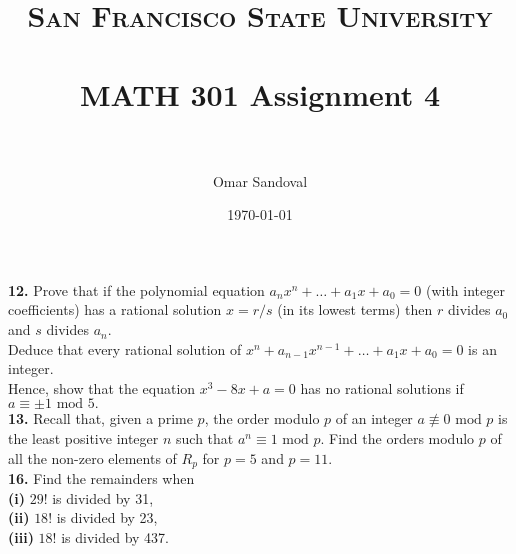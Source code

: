 \documentclass[paper=letter, fontsize=11pt]{scrartcl} %
\title{	
\normalfont \normalsize 
\textsc{San Francisco State University} \\ [25pt]
\horrule{0.5pt} \\[0.4cm] %
\huge MATH 301 Assignment 4  \\ %
\horrule{2pt} \\[0.5cm] %
}
\author{Omar Sandoval}
\date{\normalsize\today}
\begin{document}
\maketitle


\textbf{12.} Prove that if the polynomial equation $a_n x^n + \dots + a_1 x + a_0 = 0$
(with integer coefficients) has a rational solution $x = r / s$ (in its lowest terms)
then $r$ divides $a_0$ and $s$ divides $a_n$. \\
Deduce that every rational solution of $x^n + a_{n-1} x^{n-1} + \dots + a_1 x + a_0 = 0$
is an integer. \\

Hence, show that the equation $x^3 - 8x + a = 0$ has no rational solutions if
$a \equiv \pm 1 \text{ mod } 5.$
\\

\textbf{13.} Recall that, given a prime $p$, the order modulo $p$ of an integer
$a \not\equiv 0 \text{ mod } p$ is the least positive integer $n$ such that 
$a^n \equiv 1 \text{ mod } p$. Find the orders modulo $p$ of all the non-zero elements
of $R_p$ for $p = 5$ and $p = 11$. \\

\textbf{16.} Find the remainders when \\
\textbf{(i)} $29!$ is divided by 31, \\
\textbf{(ii)} $18!$ is divided by 23, \\
\textbf{(iii)} $18!$ is divided by 437.
\\
\end{document}
